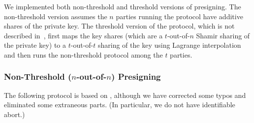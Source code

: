\documentclass[11pt]{article}
\newcommand{\?}[1]{\stackrel{?}{#1}}
\begin{document}
We implemented both non-threshold and threshold versions of presigning. 
The non-threshold version assumes the $n$ parties running the protocol have additive shares of the private key. 
The threshold version of the protocol, which is not described in~\cite{cggmp24}, first maps the key shares (which are a $t$-out-of-$n$ Shamir sharing of the private key) to a $t$-out-of-$t$ sharing of the key using Lagrange interpolation and then runs the non-threshold protocol among the $t$ parties.



\subsubsection{Non-Threshold ($n$-out-of-$n$) Presigning} \label{section:orig-presigning}

The following protocol is based on \cite[Figure~7]{cggmp24}, although we have corrected some typos and eliminated some extraneous parts. (In particular, we do not have identifiable abort.)
\end{document}

